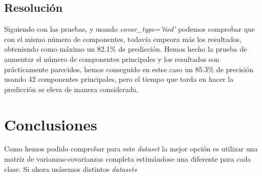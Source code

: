 \documentclass[12pt,twoside]{article}
\begin{document}
\subsection{Resolución}
Siguiendo con las pruebas, y usando \textit{covar\_type='tied'} podemos comprobar que con el mismo número de componentes, todavía empeora más los resultados, obteniendo como máximo un 82.1\% de predicción. Hemos hecho la prueba de aumentar el número de componentes principales y los resultados son prácticamente parecidos, hemos conseguido en estse caso un 85.3\% de precisión usando 42 componentes principales, pero el tiempo que tarda en hacer la predicción se eleva de manera considerada.


\section{Conclusiones}
Como hemos podido comprobar para este \textit{dataset} la mejor opción es utilizar una matriz de varianzas-covarianzas completa estimándose una diferente para cada clase.
Si ahora usásemos distintos \textit{datasets}
\end{document}
